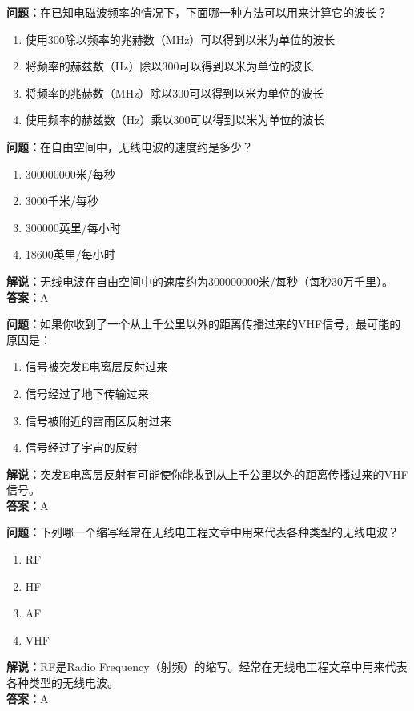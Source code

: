 \documentclass[UTF8]{ctexbook}
\begin{document}
\textbf{问题：}在已知电磁波频率的情况下，下面哪一种方法可以用来计算它的波长？
\begin{enumerate}[label=\Alph*), leftmargin=3em]
  \item 使用300除以频率的兆赫数（MHz）可以得到以米为单位的波长
  \item 将频率的赫兹数（Hz）除以300可以得到以米为单位的波长
  \item 将频率的兆赫数（MHz）除以300可以得到以米为单位的波长
  \item 使用频率的赫兹数（Hz）乘以300可以得到以米为单位的波长
\end{enumerate}

\textbf{问题：}在自由空间中，无线电波的速度约是多少？
\begin{enumerate}[label=\Alph*), leftmargin=3em]
  \item 300000000米/每秒
  \item 3000千米/每秒
  \item 300000英里/每小时
  \item 18600英里/每小时
\end{enumerate}
\textbf{解说：}无线电波在自由空间中的速度约为300000000米/每秒（每秒30万千里）。\\
\textbf{答案：}A

\textbf{问题：}如果你收到了一个从上千公里以外的距离传播过来的VHF信号，最可能的原因是：
\begin{enumerate}[label=\Alph*), leftmargin=3em]
  \item 信号被突发E电离层反射过来
  \item 信号经过了地下传输过来
  \item 信号被附近的雷雨区反射过来
  \item 信号经过了宇宙的反射
\end{enumerate}
\textbf{解说：}突发E电离层反射有可能使你能收到从上千公里以外的距离传播过来的VHF信号。\\
\textbf{答案：}A

\textbf{问题：}下列哪一个缩写经常在无线电工程文章中用来代表各种类型的无线电波？
\begin{enumerate}[label=\Alph*), leftmargin=3em]
  \item RF
  \item HF
  \item AF
  \item VHF
\end{enumerate}
\textbf{解说：}RF是Radio Frequency（射频）的缩写。经常在无线电工程文章中用来代表各种类型的无线电波。\\
\textbf{答案：}A
\end{document}
